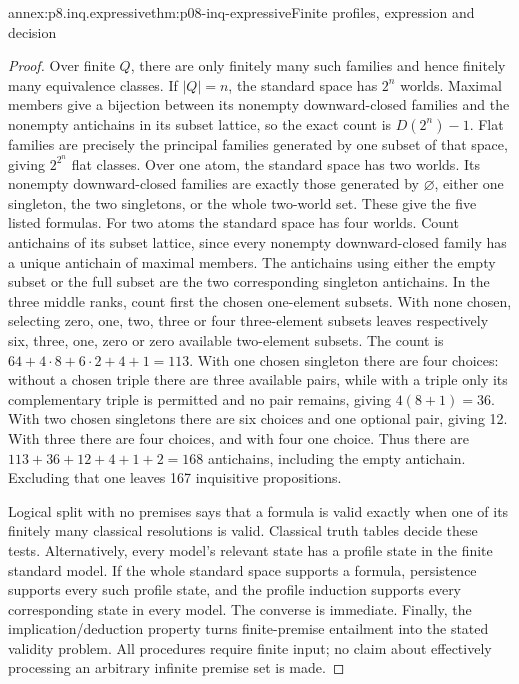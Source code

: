 \begin{annexitem}{annex:p8.inq.expressive}{thm:p08-inq-expressive}{Finite profiles, expression and decision}
\begin{proof}
Over finite \(Q\), there are only finitely many such families and hence
finitely many equivalence classes. If \(|Q|=n\), the standard space has
\(2^n\) worlds. Maximal members give a bijection between its nonempty
downward-closed families and the nonempty antichains in its subset lattice,
so the exact count is \(D(2^n)-1\). Flat families are precisely the
principal families generated by one subset of that space, giving
\(2^{2^n}\) flat classes. Over one atom, the standard space has
two worlds. Its nonempty downward-closed families are exactly those
generated by \(\varnothing\), either one singleton, the two singletons,
or the whole two-world set. These give the five listed formulas.
For two atoms the standard space has four worlds. Count antichains of its
subset lattice, since every nonempty downward-closed family has a unique
antichain of maximal members. The antichains using either the empty subset
or the full subset are the two corresponding singleton antichains. In the
three middle ranks, count first the chosen one-element subsets.
With none chosen, selecting zero, one, two, three or four three-element
subsets leaves respectively six, three, one, zero or zero available
two-element subsets. The count is
\(64+4\cdot8+6\cdot2+4+1=113\).
With one chosen singleton there are four choices: without a chosen triple
there are three available pairs, while with a triple only its complementary
triple is permitted and no pair remains, giving \(4(8+1)=36\).
With two chosen singletons there are six choices and one optional pair,
giving 12. With three there are four choices, and with four one choice.
Thus there are \(113+36+12+4+1+2=168\) antichains, including the empty
antichain. Excluding that one leaves 167 inquisitive propositions.

Logical split with no premises says that a formula is valid exactly when
one of its finitely many classical resolutions is valid. Classical truth
tables decide these tests. Alternatively, every model's relevant state
has a profile state in the finite standard model. If the whole standard
space supports a formula, persistence supports every such profile state,
and the profile induction supports every corresponding state in every
model. The converse is immediate. Finally, the implication/deduction
property turns finite-premise entailment into the stated validity problem.
All procedures require finite input; no claim about effectively processing
an arbitrary infinite premise set is made.
\end{proof}
\end{annexitem}

